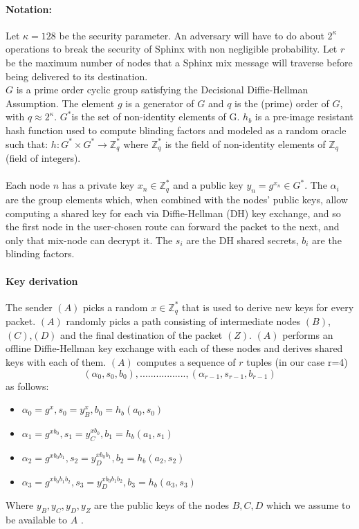 \paragraph{Notation:}Let $\kappa=128$ be the security parameter. An adversary will have to do about $2^\kappa$ operations to break the security of Sphinx with non negligible probability. 
Let $r$ be the maximum number of nodes that a Sphinx mix message will traverse before being delivered to its destination.
\\$G$ is a prime order cyclic group satisfying the Decisional Diffie-Hellman Assumption. The element $g$ is a generator of $G$ and $q$ is the (prime) order of $G$, with $q\approx2^{\kappa}$.
$G^*$is the set of non-identity elements of G. $h_b$ is a pre-image resistant hash function used to compute blinding factors and modeled as a random oracle such that:
$h:G^*\times G^*\rightarrow\mathbb{Z}^*_q$ where $\mathbb{Z}^*_q$ is the field of non-identity elements of $\mathbb{Z}_q$ (field of integers).
    \\~\\Each node $n$ has a private key $x_n\in \mathbb{Z}^*_q$ and a public key $y_n=g^{x_n}\in G^*$.
    The $\alpha_i$ are the group elements which, when combined with the nodes’ public keys, allow computing a shared key for each via Diffie-Hellman (DH) key exchange, and so the first node in the user-chosen route can forward the packet to the next, and only that mix-node can decrypt it.
    The $s_i$ are the DH shared secrets, $b_i$ are the blinding factors.

    \paragraph{Key derivation}
    The sender $(A)$ picks a random $x\in \mathbb{Z}^*_q$ that is used to derive new keys for every packet.
    \newline $(A)$ randomly picks a path consisting of intermediate nodes $(B)$, $(C)$,$(D)$ and the final destination of the packet $(Z)$.
    \newline $(A)$ performs an offline Diffie-Hellman key exchange with each of these nodes and derives shared keys with each of them.
    \newline $(A)$ computes a sequence of $r$ tuples (in our case r=4)  $$(\alpha_0,s_0,b_0),.................,(\alpha_{r-1},s_{r-1},b_{r-1})$$ as follows:
    \begin{itemize}
        \item $\alpha_0=g^x,s_0=y^x_B,b_0=h_b(a_0,s_0)$
        \item $\alpha_1=g^{xb_0},s_1=y^{xb_0}_C,b_1=h_b(a_1,s_1)$
        \item $\alpha_2=g^{xb_0b_1},s_2=y^{xb_0b_1}_D,b_2=h_b(a_2,s_2)$
        \item $\alpha_3=g^{xb_0b_1b_2},s_3=y^{xb_0b_1b_2}_D,b_3=h_b(a_3,s_3)$
    \end{itemize}
    Where $y_B,y_C,y_D,y_Z$ are the public keys of the nodes $B,C, D$  which we assume to be available to $A$ .

